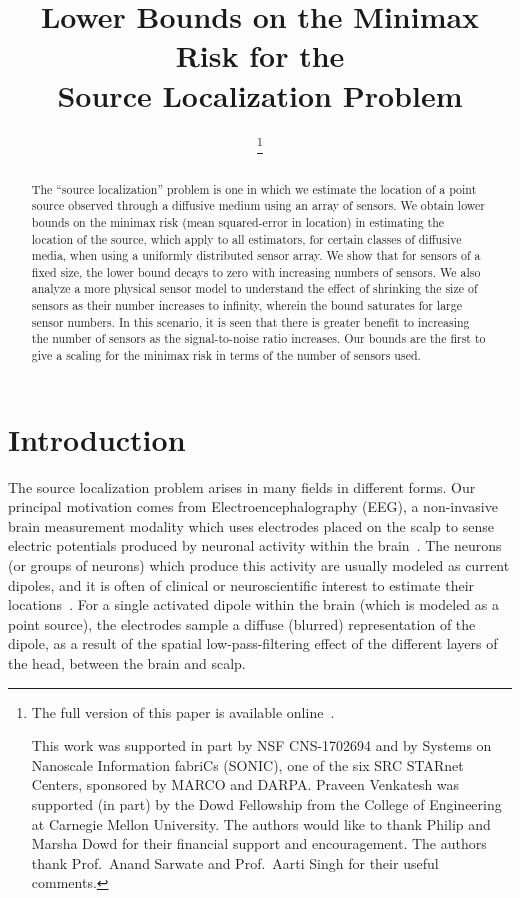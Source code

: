 \documentclass[conference,letterpaper]{IEEEtran}
\title{Lower Bounds on the Minimax Risk for the \\ Source Localization Problem}
\author{
	\IEEEauthorblockN{
		Praveen Venkatesh (\texttt{vpraveen@cmu.edu}) %
		and Pulkit Grover (\texttt{pulkit@cmu.edu}) %
	}
	\IEEEauthorblockA{
		Electrical \& Computer Engineering,
		and the Center for the Neural Basis of Cognition,
		Carnegie Mellon University
	}
	\thanks{
	The full version of this paper is available online~\cite{FullVersion}.

	This work was supported in part by NSF CNS-1702694 and by Systems on
	Nanoscale Information fabriCs (SONIC), one of the six SRC STARnet Centers,
	sponsored by MARCO and DARPA.  Praveen Venkatesh was supported (in part) by
	the Dowd Fellowship from the College of Engineering at Carnegie Mellon
	University.  The authors would like to thank Philip and Marsha Dowd for
	their financial support and encouragement. The authors thank Prof.\ Anand
	Sarwate and Prof.\ Aarti Singh for their useful comments.
	}
}
\begin{document}
\maketitle
\thispagestyle{plain}
\pagestyle{plain}

\begin{abstract}

The ``source localization'' problem is one in which we estimate the location of
a point source observed through a diffusive medium using an array of sensors.
We obtain lower bounds on the minimax risk (mean squared-error in location) in
estimating the location of the source, which apply to all estimators, for
certain classes of diffusive media, when using a uniformly distributed sensor
array. We show that for sensors of a fixed size, the lower bound decays to zero
with increasing numbers of sensors. We also analyze a more physical sensor
model to understand the effect of shrinking the size of sensors as their number
increases to infinity, wherein the bound saturates for large sensor numbers.
In this scenario, it is seen that there is greater benefit to increasing the
number of sensors as the signal-to-noise ratio increases.  Our bounds are the
first to give a scaling for the minimax risk in terms of the number of sensors
used.


\end{abstract}

\section{Introduction}

The source localization problem arises in many fields in different forms. Our
principal motivation comes from Electroencephalography (EEG), a non-invasive
brain measurement modality which uses electrodes placed on the scalp to sense
electric potentials produced by neuronal activity within the
brain~\cite{Nunez2006Electric}. The neurons (or groups of neurons) which
produce this activity are usually modeled as current dipoles, and it is often
of clinical or neuroscientific interest to estimate their
locations~\cite{Baillet2001Electromagnetic}. For a single activated dipole
within the brain (which is modeled as a point source), the electrodes sample a
diffuse (blurred) representation of the dipole, as a result of the spatial
low-pass-filtering effect of the different layers of the head, between the
brain and scalp.
\end{document}
